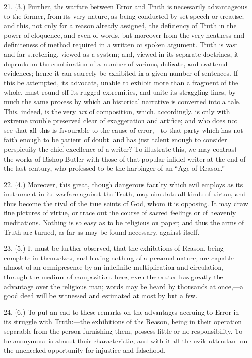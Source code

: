 21. (3.) Further, the warfare between Error and Truth is
necessarily advantageous to the former, from its very nature, as being
conducted by set speech or treatise; and this, not only for a reason
already assigned, the deficiency of Truth in the power of eloquence,
and even of words, but moreover from the very neatness and
definiteness of method required in a written or spoken argument. Truth
is vast and far-stretching, viewed as a system; and, viewed in its
separate doctrines, it depends on the combination of a number of
various, delicate, and scattered evidences; hence it can scarcely be
exhibited in a given number of sentences. If this be attempted, its
advocate, unable to exhibit more than a fragment of the whole, must
round off its rugged extremities, and unite its straggling lines, by
much the same process by which an historical narrative is converted
into a tale. This, indeed, is the very \emph{art} of composition,
which, accordingly, is only with extreme trouble preserved clear of
exaggeration and artifice; and who does not see that all this is
favourable to the cause of error,—to that party which has not faith
enough to be patient of doubt, and has just talent enough to consider
perspicuity the chief excellence of a writer? To illustrate this, we
may contrast the works of Bishop Butler with those of that popular
infidel writer at the end of the last century, who professed to be the
harbinger of an ``Age of Reason.''

22. (4.) Moreover, this great, though dangerous faculty which evil
employs as its instrument in its warfare against the Truth, may
simulate all kinds of virtue, and thus become the rival of the true
saints of God, whom it is opposing. It may draw fine pictures of
virtue, or trace out the course of sacred feelings or of heavenly
meditations. Nothing is so easy as to be religious on paper; and thus
the arms of Truth are turned, as far as may be found necessary,
against itself.

23. (5.) It must be further observed, that the exhibitions of
Reason, being complete in themselves, and having nothing of a personal
nature, are capable almost of an omnipresence by an indefinite
multiplication and circulation, through the medium of composition:
here, even the orator has greatly the advantage over the religious
man; words may be heard by thousands at once,—a good deed will be
witnessed and estimated at most by but a few.

24. (6.) To put an end to these remarks on the advantages accruing
to Error in its struggle with Truth;—the exhibitions of the Reason,
being in their operation separable from the person furnishing them,
possess little or no responsibility. To be anonymous is almost their
characteristic, and with it all the evils attendant on the unchecked
opportunity for injustice and falsehood.

